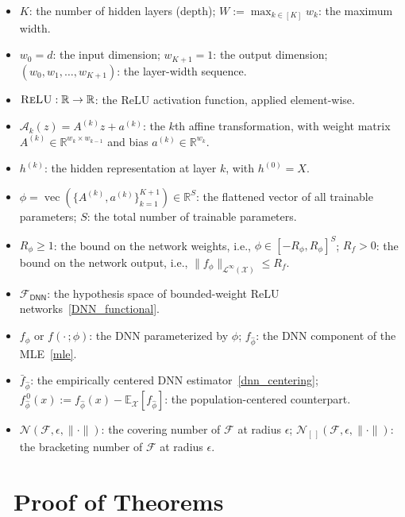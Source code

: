 \documentclass[
  12pt]{article}
\begin{document}
\begin{itemize}
    \item $K$: the number of hidden layers (depth); $W := \max_{k \in [K]} w_k$: the maximum width.
    \item $w_0 = d$: the input dimension; $w_{K+1} = 1$: the output dimension; $(w_0, w_1, \ldots, w_{K+1})$: the layer-width sequence. 
    \item $\textsc{ReLU}: \mathbb{R} \to \mathbb{R}$: the ReLU activation function, applied element-wise.
    \item $\mathcal{A}_k(z) = A^{(k)} z + a^{(k)}$: the $k$th affine transformation, with weight matrix $A^{(k)} \in \mathbb{R}^{w_k \times w_{k-1}}$ and bias $a^{(k)} \in \mathbb{R}^{w_k}$.
    \item $h^{(k)}$: the hidden representation at layer $k$, with $h^{(0)} = X$.
    \item $\phi = \operatorname{vec}(\{A^{(k)}, a^{(k)}\}_{k=1}^{K+1}) \in \mathbb{R}^S$: the flattened vector of all trainable parameters; $S$: the total number of trainable parameters.
    \item $R_\phi \geq 1$: the bound on the network weights, i.e., $\phi \in [-R_\phi, R_\phi]^S$; $R_f > 0$: the bound on the network output, i.e., $\|f_\phi\|_{\mathcal{L}^\infty(\mathcal{X})} \leq R_f$. 
    \item $\mathcal{F}_{\mathsf{DNN}}$: the hypothesis space of bounded-weight ReLU networks~\eqref{DNN_functional}.
    \item $f_\phi$ or $f(\cdot\,; \phi)$: the DNN parameterized by $\phi$; $f_{\widehat{\phi}}$: the DNN component of the MLE~\eqref{mle}.
    \item $\bar{f}_{\widehat{\phi}}$: the empirically centered DNN estimator~\eqref{dnn_centering}; $f_{\widehat{\phi}}^{\,0}(x) := f_{\widehat{\phi}}(x) - \mathbb{E}_{\mathcal{X}}[f_{\widehat{\phi}}]$: the population-centered counterpart.
    \item $\mathcal{N}(\mathcal{F}, \epsilon, \|\cdot\|)$: the covering number of $\mathcal{F}$ at radius $\epsilon$; $\mathcal{N}_{[\ ]}(\mathcal{F}, \epsilon, \|\cdot\|)$: the bracketing number of $\mathcal{F}$ at radius $\epsilon$.
\end{itemize}

\section{~Proof of Theorems}\label{appendix:theorem}
\end{document}
